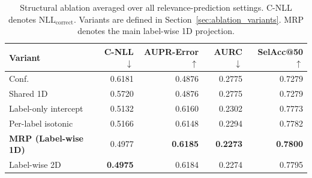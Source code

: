 \begin{table}[t]
\centering
\small
\caption{Structural ablation averaged over all relevance-prediction settings. C-NLL denotes \(\mathrm{NLL}_{\mathrm{correct}}\). Variants are defined in Section~\ref{sec:ablation_variants}. MRP denotes the main label-wise 1D projection.}
\label{tab:mrp_ablation_results}
\setlength{\tabcolsep}{2.7pt}
\begin{tabular}{lrrrr}
\toprule
Variant & C-NLL$\downarrow$ & AUPR-Error$\uparrow$ & AURC$\downarrow$ & SelAcc@50$\uparrow$ \\
\midrule
Conf. & 0.6181 & 0.4876 & 0.2775 & 0.7279 \\
Shared 1D & 0.5720 & 0.4876 & 0.2775 & 0.7279 \\
Label-only intercept & 0.5132 & 0.6160 & 0.2302 & 0.7773 \\
Per-label isotonic & 0.5166 & 0.6148 & 0.2294 & 0.7782 \\
\textbf{MRP (Label-wise 1D)} & 0.4977 & \textbf{0.6185} & \textbf{0.2273} & \textbf{0.7800} \\
Label-wise 2D & \textbf{0.4975} & 0.6184 & 0.2274 & 0.7795 \\
\bottomrule
\end{tabular}
\end{table}
